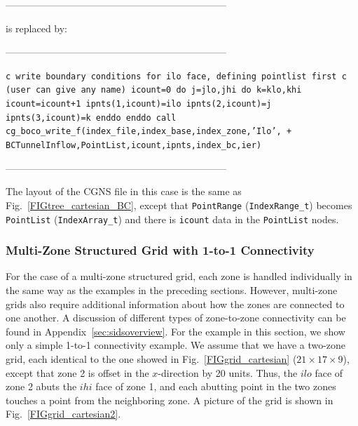 \documentclass[12pt]{article}
\begin{document}
--------------------------------------------------------------------

\noindent is replaced by:

--------------------------------------------------------------------

{\tt \noindent c  write boundary conditions for ilo face, defining pointlist first 
\newline c  (user can give any name)
\newline\indent   icount=0
\newline\indent   do j=jlo,jhi
\newline\indent\indent     do k=klo,khi
\newline\indent\indent\indent       icount=icount+1
\newline\indent\indent\indent       ipnts(1,icount)=ilo
\newline\indent\indent\indent       ipnts(2,icount)=j
\newline\indent\indent\indent       ipnts(3,icount)=k
\newline\indent\indent     enddo
\newline\indent   enddo
\newline\indent      call cg\_boco\_write\_f(index\_file,index\_base,index\_zone,'Ilo',
\newline + \indent BCTunnelInflow,PointList,icount,ipnts,index\_bc,ier)}

--------------------------------------------------------------------

\noindent The layout of the CGNS file in this case is the same as
Fig.~\ref{FIGtree_cartesian_BC}, except that {\tt PointRange}
({\tt IndexRange\_t}) becomes {\tt PointList} ({\tt IndexArray\_t})
and there is {\tt icount} data in
the {\tt PointList} nodes.

\subsubsection{Multi-Zone Structured Grid with 1-to-1 Connectivity} \label{sec:str1to1}

For the case of a multi-zone structured grid, each zone is
handled individually in the same way as the examples in the preceding
sections.  However, multi-zone grids also require additional
information about how the zones are connected to one another.
A discussion of different types of zone-to-zone connectivity can be found
in Appendix~\ref{sec:sidsoverview}.  For the example in this section, we show only
a simple 1-to-1 connectivity example.  We assume that we have a two-zone
grid, each identical to the one showed in Fig.~\ref{FIGgrid_cartesian}
($21 \times 17 \times 9$), except that zone 2 is offset in the
$x$-direction by 20 units.  Thus, the $ilo$ face of zone 2 abuts
the $ihi$ face of zone 1, and each abutting point in the two zones 
touches a point from the neighboring zone.
A picture of the grid is shown in
Fig.~\ref{FIGgrid_cartesian2}.
\end{document}
